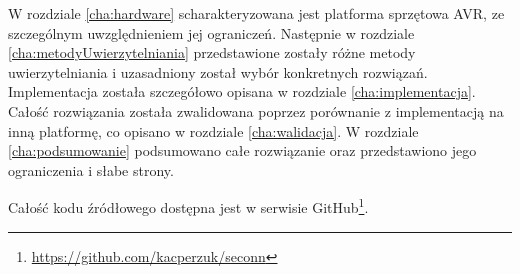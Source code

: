 W rozdziale \ref{cha:hardware} scharakteryzowana jest platforma sprzętowa AVR, ze szczególnym uwzględnieniem jej ograniczeń. Następnie w rozdziale \ref{cha:metodyUwierzytelniania} przedstawione zostały różne metody uwierzytelniania i uzasadniony został wybór konkretnych rozwiązań. Implementacja została szczegółowo opisana w rozdziale \ref{cha:implementacja}. Całość rozwiązania została zwalidowana poprzez porównanie z implementacją na inną platformę, co opisano w rozdziale \ref{cha:walidacja}. W rozdziale \ref{cha:podsumowanie} podsumowano całe rozwiązanie oraz przedstawiono jego ograniczenia i słabe strony.

Całość kodu źródłowego dostępna jest w serwisie GitHub\footnote{\url{https://github.com/kacperzuk/seconn}}.
